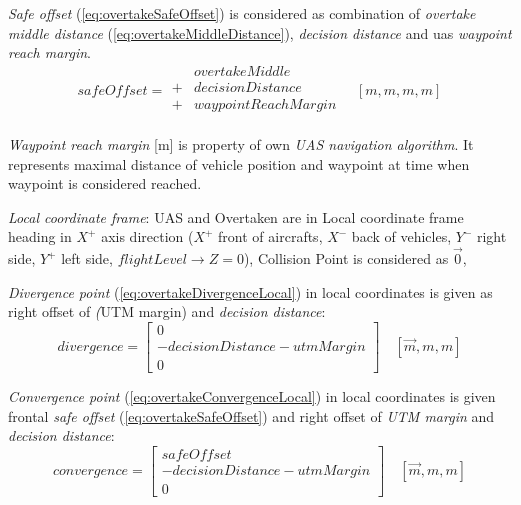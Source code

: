 \noindent \emph{Safe offset} (\ref{eq:overtakeSafeOffset}) is considered as combination of \emph{overtake middle distance} (\ref{eq:overtakeMiddleDistance}), \emph{decision distance} and uas \emph{waypoint reach margin}.
\begin{equation}\label{eq:overtakeSafeOffset}
    safeOffset= \begin{aligned}
                    &  overtakeMiddle \\
                    +& decisionDistance \\
                    +& waypointReachMargin\\
                \end{aligned}
                \quad [m,m,m,m]
\end{equation}

\begin{note}
    \emph{Waypoint reach margin} [m] is property of own \emph{UAS navigation algorithm}. It represents maximal distance of vehicle position and waypoint at time when waypoint is considered reached. 
\end{note}

\noindent \emph{Local coordinate frame}: UAS and Overtaken are in Local coordinate frame heading in $X^+$ axis direction ($X^+$ front of aircrafts, $X^-$ back of vehicles, $Y^-$ right side, $Y^+$ left side, $flightLevel\to Z=0$), Collision Point is considered as $\vec{0}$,

\emph{Divergence point} (\ref{eq:overtakeDivergenceLocal}) in local coordinates is given as right offset of \emph(UTM margin) and \emph{decision distance}:
\begin{equation}\label{eq:overtakeDivergenceLocal}
    divergence= 
    \begin{bmatrix}
        0\\
        -decisionDistance - utmMargin\\
        0
    \end{bmatrix}
    \quad [\vec{m},m,m]
\end{equation}

\emph{Convergence point} (\ref{eq:overtakeConvergenceLocal}) in local coordinates is given frontal \emph{safe offset} (\ref{eq:overtakeSafeOffset}) and right offset of \emph{UTM margin} and \emph{decision distance}:
\begin{equation}\label{eq:overtakeConvergenceLocal}
    convergence= 
    \begin{bmatrix}
        safeOffset\\
        -decisionDistance - utmMargin\\
        0
    \end{bmatrix}
    \quad [\vec{m},m,m]
\end{equation}

